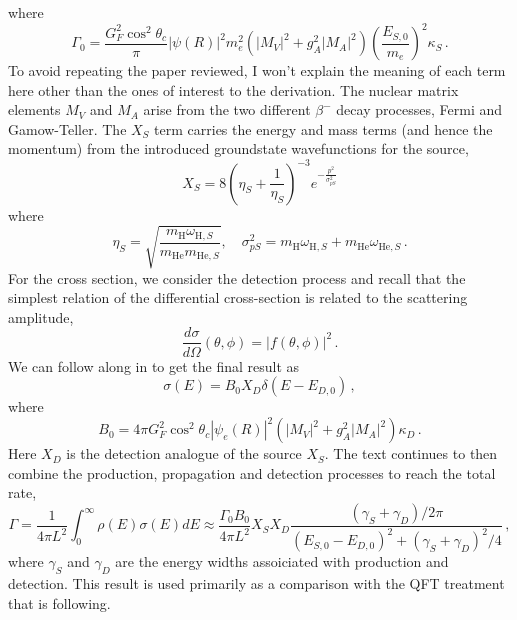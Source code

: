 \documentclass[10pt]{article}
\begin{document}
where
\begin{equation}
  \Gamma_{0} = \frac{G^{2}_{F}\cos^{2}\theta_{c}}{\pi}|\psi(R)|^{2}m_{e}^{2}(|M_{V}|^{2}+g^{2}_{A}|M_{A}|^{2})\left(\frac{E_{S,0}}{m_{e}}\right)^{2}\kappa_{S}\, .
\end{equation}
To avoid repeating the paper reviewed, I won't explain the meaning of each term here other than the ones of interest to the derivation. The nuclear matrix elements $M_{V}$ and $M_{A}$ arise from the two different $\beta^{-}$ decay processes, Fermi and Gamow-Teller. The $X_{S}$ term carries the energy and mass terms (and hence the momentum) from the introduced groundstate wavefunctions for the source,
\begin{equation}
  X_{S} = 8\left(\eta_{S} + \frac{1}{\eta_{S}}\right)^{-3}e^{-\frac{p^{2}}{\sigma_{pS}^{2}}}
\end{equation}
where
\begin{equation}
  \eta_{S} = \sqrt{\frac{m_{\text{H}}\omega_{\text{H},S}}{m_{\text{He}}m_{\text{He},S}}}, \quad \sigma^{2}_{pS} = m_{\text{H}}\omega_{\text{H},S} + m_{\text{He}}\omega_{\text{He},S}\, .
\end{equation}
For the cross section, we consider the detection process and recall that the simplest relation of the differential cross-section is related to the scattering amplitude,
\begin{equation}
  \frac{d\sigma}{d\Omega}(\theta, \phi) = |f(\theta,\phi)|^{2}\, .
\end{equation}
We can follow along in \cite{bahcall, Akhmedov_2008} to get the final result as
\begin{equation}
  \sigma(E) = B_{0}X_{D}\delta(E - E_{D,0})\, ,
\end{equation}
where
\begin{equation}
  B_{0} = 4\pi G_{F}^{2}\cos^{2}\theta_{c}|\psi_{e}(R)|^{2}(|M_{V}|^{2} + g_{A}^{2}|M_{A}|^{2})\kappa_{D}\, .
\end{equation}
Here $X_{D}$ is the detection analogue of the source $X_{S}$. The text continues to then combine the production, propagation and detection processes to reach the total rate,
\begin{equation}
  \Gamma = \frac{1}{4\pi L^{2}}\int_{0}^{\infty}\rho(E)\sigma(E)dE \approx \frac{\Gamma_{0}B_{0}}{4\pi L^{2}}X_{S}X_{D}\frac{(\gamma_{S} + \gamma_{D})/2\pi}{(E_{S,0} - E_{D,0})^{2} + (\gamma_{S} + \gamma_{D})^{2}/4}\, ,
\end{equation}
where $\gamma_{S}$ and $\gamma_{D}$ are the energy widths assoiciated with production and detection. This result is used primarily as a comparison with the QFT treatment that is following.
\end{document}

